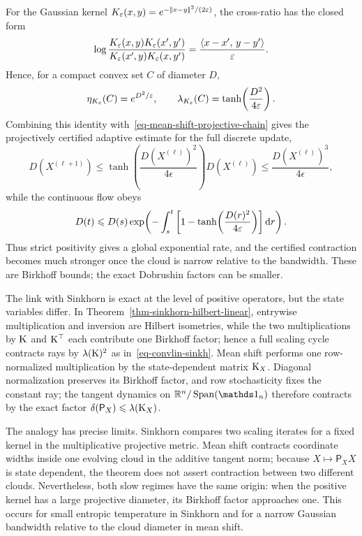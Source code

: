 For the Gaussian kernel $K_\varepsilon(x,y)=e^{-|\!| x-y |\!|^2/(2\varepsilon)}$, the cross-ratio has the closed form
\[
	\log\frac{K_\varepsilon(x,y)K_\varepsilon(x',y')}
	          {K_\varepsilon(x',y)K_\varepsilon(x,y')}
	=
	\frac{\langle x-x',\,y-y'\rangle}{\varepsilon}.
\]
Hence, for a compact convex set $C$ of diameter $D$,
\begin{equation}\label{eq-gaussian-mean-shift-birkhoff-factor}
	\eta_{K_\varepsilon}(C)=e^{D^2/\varepsilon},
	\qquad
	\lambda_{K_\varepsilon}(C)=\tanh\!\left(\frac{D^2}{4\varepsilon}\right).
\end{equation}
Combining this identity with~\eqref{eq-mean-shift-projective-chain} gives the projectively certified adaptive estimate for the full discrete update,
\[
	D(X^{(\ell+1)})
	\leq
	\tanh\!\left(\frac{D(X^{(\ell)})^2}{4\epsilon}\right)D(X^{(\ell)})
	\leq
	\frac{D(X^{(\ell)})^3}{4\epsilon},
\]
while the continuous flow obeys
\begin{equation}\label{eq-gaussian-mean-shift-adaptive-contraction}
	D(t)
	\leqslant
	D(s)\exp\!\left(
		-\int_s^t
		\left[1-\tanh\!\left(\frac{D(r)^2}{4\varepsilon}\right)\right]\mathrm{d} r
	\right).
\end{equation}
Thus strict positivity gives a global exponential rate, and the certified contraction becomes much stronger once the cloud is narrow relative to the bandwidth. These are Birkhoff bounds; the exact Dobrushin factors can be smaller.

\begin{rem}\label{rem-sinkhorn-mean-shift-contraction}
	The link with Sinkhorn is exact at the level of positive operators, but the state variables differ. In Theorem~\ref{thm-sinkhorn-hilbert-linear}, entrywise multiplication and inversion are Hilbert isometries, while the two multiplications by $\mathrm{K}$ and $\mathrm{K}^\top$ each contribute one Birkhoff factor; hence a full scaling cycle contracts rays by $\lambda(\mathrm{K})^2$ as in~\eqref{eq-convlin-sinkh}. Mean shift performs one row-normalized multiplication by the state-dependent matrix $\mathrm{K}_X$. Diagonal normalization preserves its Birkhoff factor, and row stochasticity fixes the constant ray; the tangent dynamics on $\RR^n/\Span(\ones_n)$ therefore contracts by the exact factor $\delta(\mathsf P_X)\leqslant\lambda(\mathrm{K}_X)$.

	The analogy has precise limits. Sinkhorn compares two scaling iterates for a fixed kernel in the multiplicative projective metric. Mean shift contracts coordinate widths inside one evolving cloud in the additive tangent norm; because $X\mapsto\mathsf P_XX$ is state dependent, the theorem does not assert contraction between two different clouds. Nevertheless, both slow regimes have the same origin: when the positive kernel has a large projective diameter, its Birkhoff factor approaches one. This occurs for small entropic temperature in Sinkhorn and for a narrow Gaussian bandwidth relative to the cloud diameter in mean shift.
\end{rem}

